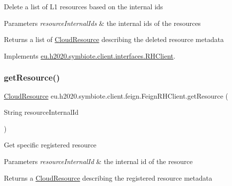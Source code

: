 Delete a list of L1 resources based on the internal ids


\begin{DoxyParams}{Parameters}
{\em resource\+Internal\+Ids} & the internal ids of the resources \\
\hline
\end{DoxyParams}
\begin{DoxyReturn}{Returns}
a list of \hyperlink{}{Cloud\+Resource} describing the deleted resource metadata 
\end{DoxyReturn}


Implements \hyperlink{interfaceeu_1_1h2020_1_1symbiote_1_1client_1_1interfaces_1_1RHClient_a69bba5fe6031648cc2636866cfe6f103}{eu.\+h2020.\+symbiote.\+client.\+interfaces.\+R\+H\+Client}.

\mbox{\label{classeu_1_1h2020_1_1symbiote_1_1client_1_1feign_1_1FeignRHClient_afeca18b59c770a4ce9789f4d7cfd31ab}} 
\subsubsection{\texorpdfstring{get\+Resource()}{getResource()}}
{\footnotesize\ttfamily \hyperlink{classeu_1_1h2020_1_1symbiote_1_1cloud_1_1model_1_1internal_1_1CloudResource}{Cloud\+Resource} eu.\+h2020.\+symbiote.\+client.\+feign.\+Feign\+R\+H\+Client.\+get\+Resource (\begin{DoxyParamCaption}\item[{String}]{resource\+Internal\+Id }\end{DoxyParamCaption})}

Get specific registered resource


\begin{DoxyParams}{Parameters}
{\em resource\+Internal\+Id} & the internal id of the resource \\
\hline
\end{DoxyParams}
\begin{DoxyReturn}{Returns}
a \hyperlink{}{Cloud\+Resource} describing the registered resource metadata 
\end{DoxyReturn}


